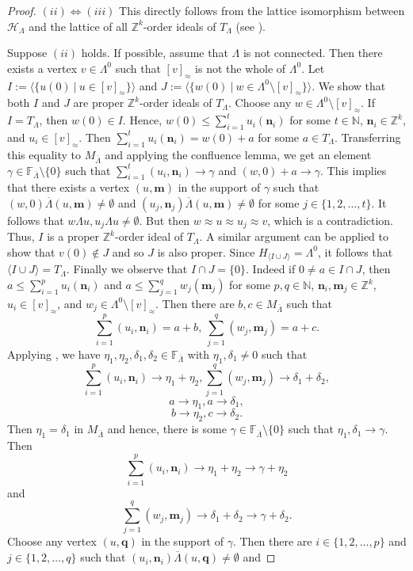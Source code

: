 \documentclass[a4paper,reqno,12pt]{amsart}
\numberwithin{equation}{section}
\theoremstyle{definition}
\theoremstyle{remark}
\newcommand{\N}{\mathbf{n}}
\newcommand{\M}{\mathbf{m}}
\newcommand{\Q}{\mathbf{q}}
\begin{document}
\begin{proof}
$(ii)\Leftrightarrow (iii)$ This directly follows from the lattice isomorphism between $\mathcal{H}_\Lambda$ and the lattice of all $\mathbb{Z}^k$-order ideals of $T_\Lambda$ (see \cite[Proposition 4.5]{HMPS1}).  

Suppose $(ii)$ holds. If possible, assume that $\Lambda$ is not connected. Then there exists a vertex $v\in \Lambda^0$ such that $[v]_{\approx}$ is not the whole of $\Lambda^0$. Let $I:=\langle \{u(0)~|~u\in [v]_{\approx}\}\rangle$ and $J:=\langle \{w(0)~|~w\in \Lambda^0\setminus [v]_{\approx}\}\rangle$. We show that both $I$ and $J$ are proper $\mathbb{Z}^k$-order ideals of $T_\Lambda$. Choose any $w\in \Lambda^0\setminus [v]_{\approx}$. If $I=T_\Lambda$, then $w(0)\in I$. Hence, $w(0)\le \displaystyle{\sum_{i=1}^{t}}u_i(\N_i)$ for some $t\in \mathbb{N}$, $\N_i\in \mathbb{Z}^k$, and $u_i\in [v]_{\approx}$. Then $\displaystyle{\sum_{i=1}^{t}}u_i(\N_i)=w(0)+a$ for some $a\in T_\Lambda$. Transferring this equality to $M_{\overline{\Lambda}}$ and applying the confluence lemma, we get an element $\gamma\in \mathbb{F}_{\overline{\Lambda}}\setminus \{0\}$ such that $\displaystyle{\sum_{i=1}^{t}}(u_i,\N_i)\longrightarrow \gamma$ and $(w,0)+a \longrightarrow \gamma$. This implies that there exists a vertex $(u,\M)$ in the support of $\gamma$ such that $(w,0)\overline{\Lambda}(u,\M)\neq \emptyset$ and $(u_j,\N_j)\overline{\Lambda} (u,\M)\neq \emptyset$ for some $j\in \{1,2,\ldots,t\}$. It follows that $w\Lambda u,u_j\Lambda u\neq \emptyset$. But then $w\approx u\approx u_j\approx v$, which is a contradiction. Thus, $I$ is a proper $\mathbb{Z}^k$-order ideal of $T_\Lambda$. A similar argument can be applied to show that $v(0)\notin J$ and so $J$ is also proper. Since $H_{\langle I\cup J\rangle}=\Lambda^0$, it follows that $\langle I\cup J\rangle=T_\Lambda$. Finally we observe that $I\cap J=\{0\}$. Indeed if $0\neq a\in I\cap J$, then $a\le \displaystyle{\sum_{i=1}^{p}} u_i(\N_i)$ and $a\le \displaystyle{\sum_{j=1}^{q}}w_j(\M_j)$ for some $p,q\in \mathbb{N}$, $\N_i,\M_j\in \mathbb{Z}^k$, $u_i\in [v]_{\approx}$, and $w_j\in \Lambda^0\setminus [v]_{\approx}$. Then there are $b,c\in M_{\overline{\Lambda}}$ such that \[\displaystyle{\sum_{i=1}^{p}} (u_i,\N_i)=a+b,~\displaystyle{\sum_{j=1}^{q}}(w_j,\M_j)=a+c.\] Applying \cite[Lemma 3.1 \& 3.5]{HMPS1}, we have $\eta_1,\eta_2,\delta_1,\delta_2\in \mathbb{F}_{\overline{\Lambda}}$ with $\eta_1,\delta_1\neq 0$ such that \[\displaystyle{\sum_{i=1}^{p}} (u_i,\N_i)\longrightarrow \eta_1+\eta_2,\displaystyle{\sum_{j=1}^{q}}(w_j,\M_j)\longrightarrow \delta_1+\delta_2,\]  \[a\longrightarrow \eta_1,a\longrightarrow \delta_1,\] \[b\longrightarrow \eta_2,c\longrightarrow \delta_2.\] Then $\eta_1=\delta_1$ in $M_{\overline{\Lambda}}$ and hence, there is some $\gamma\in \mathbb{F}_{\overline{\Lambda}}\setminus \{0\}$ such that $\eta_1,\delta_1\longrightarrow \gamma$. Then \[\displaystyle{\sum_{i=1}^{p}} (u_i,\N_i)\longrightarrow \eta_1+\eta_2\longrightarrow \gamma+\eta_2\] and \[\displaystyle{\sum_{j=1}^{q}}(w_j,\M_j)\longrightarrow \delta_1+\delta_2\longrightarrow \gamma+\delta_2.\] Choose any vertex $(u,\Q)$ in the support of $\gamma$. Then there are $i\in \{1,2,\ldots,p\}$ and $j\in \{1,2,\ldots,q\}$ such that $(u_i,\N_i)\overline{\Lambda}(u,\Q)\neq \emptyset$ and 
\end{proof}
\end{document}
